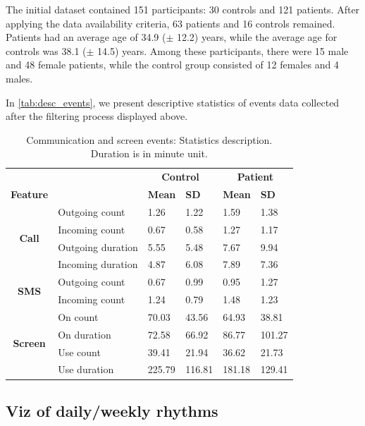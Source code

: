 \documentclass[journal, onecolumn, 11pt]{IEEEtran}
\begin{document}
The initial dataset contained 151 participants: 30 controls and 121 patients. After applying the data availability criteria, 63 patients and 16 controls remained. Patients had an average age of 34.9 ($\pm$ 12.2) years, while the average age for controls was 38.1 ($\pm$ 14.5) years. Among these participants, there were 15 male and 48 female patients, while the control group consisted of 12 females and 4 males.

In \autoref{tab:desc_events}, we present descriptive statistics of events data collected after the filtering process displayed above.

\begin{table}[htbp]
\centering
\begin{tabular}{@{}clllll@{}}
\toprule
& & \multicolumn{2}{c}{\textbf{Control}} & \multicolumn{2}{c}{\textbf{Patient}} \\
\cmidrule(lr){3-4} \cmidrule(lr){5-6}
\textbf{Feature} & & \textbf{Mean} & \textbf{SD} & \textbf{Mean} & \textbf{SD} \\
\midrule
\multirow{4}{*}{\textbf{Call}} & Outgoing count & 1.26 & 1.22 & 1.59 & 1.38 \\
& Incoming count & 0.67 & 0.58 & 1.27 & 1.17 \\
& Outgoing duration & 5.55 & 5.48 & 7.67 & 9.94 \\
& Incoming duration & 4.87 & 6.08 & 7.89 & 7.36 \\
\midrule
\multirow{2}{*}{\textbf{SMS}} & Outgoing count & 0.67 & 0.99 & 0.95 & 1.27 \\
& Incoming count & 1.24 & 0.79 & 1.48 & 1.23\\
\midrule
\multirow{4}{*}{\textbf{Screen}} & On count & 70.03 & 43.56 & 64.93 & 38.81 \\
& On duration & 72.58 & 66.92 & 86.77 & 101.27 \\
& Use count & 39.41 & 21.94 & 36.62 & 21.73 \\
& Use duration & 225.79 & 116.81 & 181.18 & 129.41 \\
\bottomrule
\end{tabular}
\caption{Communication and screen events: Statistics description. Duration is in minute unit.}
\label{tab:desc_events}
\end{table}


\subsection{Viz of daily/weekly rhythms}
\end{document}
